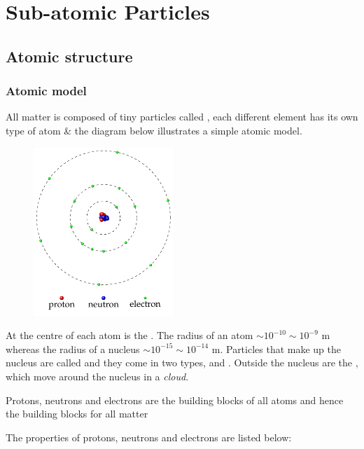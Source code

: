 \chapter{Sub-atomic Particles}

\section{Atomic structure}

\subsection{Atomic model}\label{ch:atomic-model}


All matter is composed of tiny particles called , each different element has its own type of atom \& the diagram below illustrates a simple atomic model.
\begin{figure}[h]
	\vspace*{5pt}
	\centering
	\includegraphics[height=180pt]{atomic-model.pdf}
	\vspace*{-20pt}
\end{figure}

At the centre of each atom is the . The radius of an atom $\sim 10^{-10} \sim 10^{-9} \text{ m}$ whereas the radius of a nucleus $\sim 10^{-15} \sim 10^{-14} \text{ m}$. Particles that make up the nucleus are called  and they come in two types,  and . Outside the nucleus are the , which move around the nucleus in a \emph{cloud}.

Protons, neutrons and electrons are the building blocks of all atoms and hence the building blocks for all matter

\cmt The properties of protons, neutrons and electrons are listed below:

